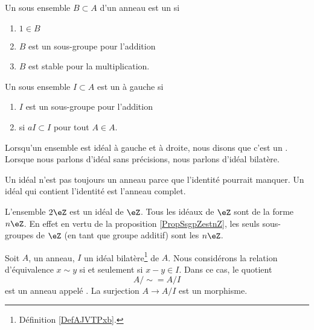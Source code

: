 \begin{definition}  \label{DefAJVTPxb}
    Un sous ensemble \( B\subset A\) d'un anneau est un  si
    \begin{enumerate}
        \item
            \( 1\in B\)
        \item
            \( B\) est un sous-groupe pour l'addition
        \item
            \( B\) est stable pour la multiplication.
    \end{enumerate}
    Un sous ensemble \( I\subset A\) est un  à gauche si
    \begin{enumerate}
        \item
            \( I\) est un sous-groupe pour l'addition
        \item
            si \( aI\subset I\) pour tout \( A\in A\).
    \end{enumerate}
\end{definition}
Lorsqu'un ensemble est idéal à gauche et à droite, nous disons que c'est un . Lorsque nous parlons d'idéal sans précisions, nous parlons d'idéal bilatère.

\begin{remark}
    Un idéal n'est pas toujours un anneau parce que l'identité pourrait manquer. Un idéal qui contient l'identité est l'anneau complet.
\end{remark}

\begin{example}
    L'ensemble \( 2\eZ\) est un idéal de \( \eZ\). Tous les idéaux de \( \eZ\) sont de la forme \( n\eZ\). En effet en vertu de la proposition \ref{PropSsgpZestnZ}, les seuls sous-groupes de \( \eZ\) (en tant que groupe additif) sont les \( n\eZ\).
\end{example}


Soit \( A\), un anneau, \( I\) un idéal bilatère\footnote{Définition \ref{DefAJVTPxb}.} de \( A\). Nous considérons la relation d'équivalence \( x\sim y\) si et seulement si \( x-y\in I\). Dans ce cas, le quotient
\begin{equation}
    A/\sim=A/I
\end{equation}
est un anneau appelé . La surjection \( A\to A/I\) est un morphisme.

